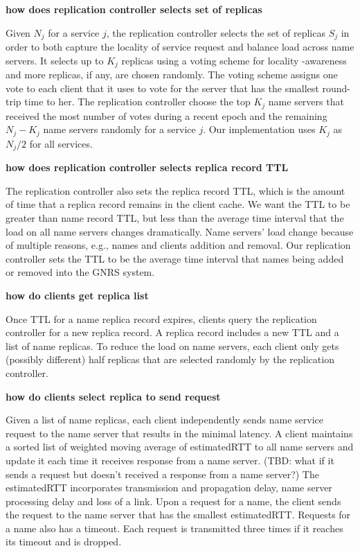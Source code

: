 {{		{\bf how does replication controller selects set of replicas}
		
		Given $N_j$ for a service $j$, the replication controller selects the set of replicas $S_j$ in order to both capture the locality of service request and balance load across name servers. It selects up to $K_j$ replicas using a voting scheme for locality
		-awareness and more replicas, if any, are chosen randomly. The voting scheme assigns one vote to each client that it uses to vote for the server that has the smallest round-trip time to her. The replication controller choose the top $K_j$ name servers that received the most number of votes during a recent epoch and the remaining $N_j - K_j$ name servers randomly for a service $j$. Our implementation uses $K_j$ as $N_j/2$ for all services.
		
		{\bf how does replication controller selects replica record TTL}
		
		The replication controller also sets the replica record TTL, which is the amount of time that a replica record remains in the client cache.  We want the TTL to be greater than name record TTL, but less than the average time interval that the load on all name servers changes dramatically. Name servers' load change because of multiple reasons, e.g., names and clients addition and removal. Our replication controller sets the TTL to be the average time interval that names being added or removed into the GNRS system.  
		
		{\bf how do clients get replica list}
		
		Once TTL for a name replica record expires, clients query the replication controller for a new replica record. A replica record includes a new TTL and a list of name replicas. To reduce the load on name servers, each client only gets (possibly different) half replicas that are selected randomly by the replication controller. 
		
		{\bf how do clients select replica to send request}
		
		Given a list of name replicas, each client independently sends name service request to the name server that results in the minimal latency. A client maintains a sorted list of weighted moving average of estimatedRTT to all name servers and update it each time it receives response from a name server. (TBD: what if it sends a request but doesn't received a response from a name server?) The estimatedRTT incorporates transmission and propagation delay, name server processing delay and loss of a link. Upon a request for a name, the client sends the request to the name server that has the smallest estimatedRTT. Requests for a name also has a timeout.  Each request is transmitted three times if it reaches its timeout and is dropped. 
	}
	
}
